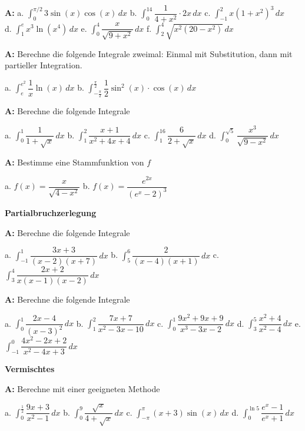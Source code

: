 \documentclass[landscape,twocolumn,a4paper]{article}
\begin{document}
\textbf{A:}   
a.  $\displaystyle\int_0^{\pi/2} 3\sin(x)\cos(x) \, dx$ \quad
b.  $\displaystyle\int_0^{14} \dfrac{1}{4+x^2}\cdot 2x \, dx$ \quad
c.  $\displaystyle\int_{-1}^2 x(1+x^2)^3  \, dx$   \\

d.  $\displaystyle\int_{1}^e x^3 \ln(x^4)  \, dx$ \quad
e.  $\displaystyle\int_0^4 \dfrac{x}{\sqrt{9+x^2}}  \, dx$ \quad
f.  $\displaystyle\int_2^4 \sqrt{x^2(20-x^2)}  \, dx$ \quad
\bigskip  {}

\textbf{A:}   
Berechne die folgende Integrale zweimal: Einmal mit Substitution, dann mit partieller Integration.

a.  $\displaystyle\int_e^{e^2} \dfrac{1}{x}\ln(x)\, dx$ \quad
b.  $\displaystyle\int_{-\frac{\pi}{2}}^{\frac{\pi}{2}} \dfrac{1}{2}\sin^2(x) \cdot \cos(x)\, dx$ \quad
\bigskip  {}

\newpage
\textbf{A:}   
Berechne die folgende Integrale 

a.  $\displaystyle\int_0^1 \dfrac{1}{1+\sqrt{x}}\, dx$ \quad
b.  $\displaystyle\int_1^2 \dfrac{x+1}{x^2+4x+4} \, dx$ \quad
c.  $\displaystyle\int_1^{16} \dfrac{6}{2+\sqrt{x}} \, dx$ \quad
d.  $\displaystyle\int_0^{\sqrt{5}} \dfrac{x^3}{\sqrt{9-x^2}} \, dx$ \quad
\bigskip  {}

\textbf{A:}   
Bestimme eine Stammfunktion von $f$

a.  $f(x) = \dfrac{x}{\sqrt{4-x^2}}$ \quad 
b.  $f(x) = \dfrac{e^{2x}}{(e^x-2)^3}$
\bigskip  {}

\textbf{Partialbruchzerlegung} 
\bigskip

\textbf{A:}   
Berechne die folgende Integrale

a.  $\displaystyle\int_{-1}^1 \dfrac{3x+3}{(x-2)(x+7)}\, dx$ \quad
b.  $\displaystyle\int_{5}^6 \dfrac{2}{(x-4)(x+1)}\, dx$ \quad
c.  $\displaystyle\int_{3}^4 \dfrac{2x+2}{x(x-1)(x-2)}\, dx$ \quad
\bigskip  {}

\textbf{A:}   
Berechne die folgende Integrale

a.  $\displaystyle\int_{0}^1 \dfrac{2x-4}{(x-3)^2}\, dx$ \quad
b.  $\displaystyle\int_{1}^2 \dfrac{7x+7}{x^2-3x-10}\, dx$ \quad
c.  $\displaystyle\int_{0}^1 \dfrac{9x^2+9x+9}{x^3-3x-2}\, dx$ \quad
d.  $\displaystyle\int_{3}^5 \dfrac{x^2+4}{x^2-4}\, dx$ \quad
e.  $\displaystyle\int_{-1}^0 \dfrac{4x^2-2x+2}{x^2-4x+3}\, dx$ \quad
\bigskip  {}

\textbf{Vermischtes} 
\bigskip

\textbf{A:}   
Berechne mit einer geeigneten Methode

a.  $\displaystyle\int_{0}^{\frac{1}{2}} \dfrac{9x+3}{x^2-1}\, dx$ \quad
b.  $\displaystyle\int_{0}^{9} \dfrac{\sqrt{x}}{4+\sqrt{x}}\, dx$ \quad
c.  $\displaystyle\int_{-\pi}^{\pi} (x+3)\sin(x)\, dx$ \quad
d.  $\displaystyle\int_{0}^{\ln5} \dfrac{e^x-1}{e^x+1}\, dx$ \\

\bigskip  {}
\end{document}
